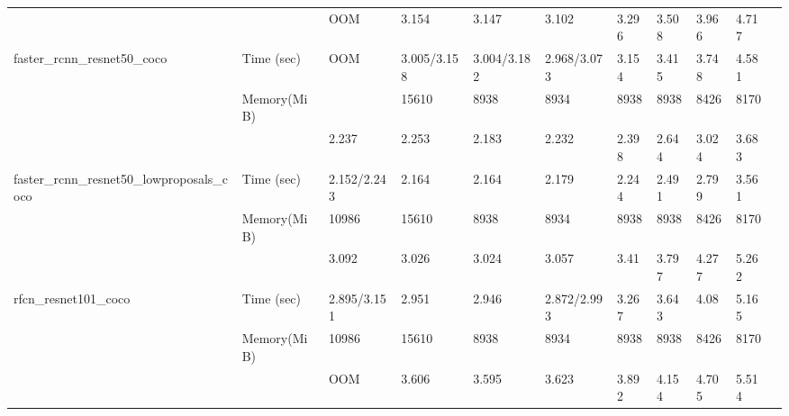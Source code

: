 \documentclass[conference]{IEEEtran}
\begin{document}
\begin{table}[]
{\begin{tabular}{lllllllllll}
                                                                &               & OOM                 & 3.154              & 3.147             & 3.102             & 3.296            & 3.508  & 3.966             & 4.717       &          \\
faster\_rcnn\_resnet50\_coco                                    & Time (sec)    & OOM                 & 3.005/3.158        & 3.004/3.182       & 2.968/3.073       & 3.154            & 3.415  & 3.748             & 4.581       &          \\
                                                                & Memory(MiB)   &                     & 15610              & 8938              & 8934              & 8938             & 8938   & 8426              & 8170        &          \\
                                                                &               & 2.237               & 2.253              & 2.183             & 2.232             & 2.398            & 2.644  & 3.024             & 3.683       &          \\
faster\_rcnn\_resnet50\_lowproposals\_coco                      & Time (sec)    & 2.152/2.243         & 2.164              & 2.164             & 2.179             & 2.244            & 2.491  & 2.799             & 3.561       &          \\
                                                                & Memory(MiB)   & 10986               & 15610              & 8938              & 8934              & 8938             & 8938   & 8426              & 8170        &          \\
                                                                &               & 3.092               & 3.026              & 3.024             & 3.057             & 3.41             & 3.797  & 4.277             & 5.262       &          \\
rfcn\_resnet101\_coco                                           & Time (sec)    & 2.895/3.151         & 2.951              & 2.946             & 2.872/2.993       & 3.267            & 3.643  & 4.08              & 5.165       &          \\
                                                                & Memory(MiB)   & 10986               & 15610              & 8938              & 8934              & 8938             & 8938   & 8426              & 8170        &          \\
                                                                &               & OOM                 & 3.606              & 3.595             & 3.623             & 3.892            & 4.154  & 4.705             & 5.514       &          \\

\end{tabular}}
\end{table}
\end{document}
